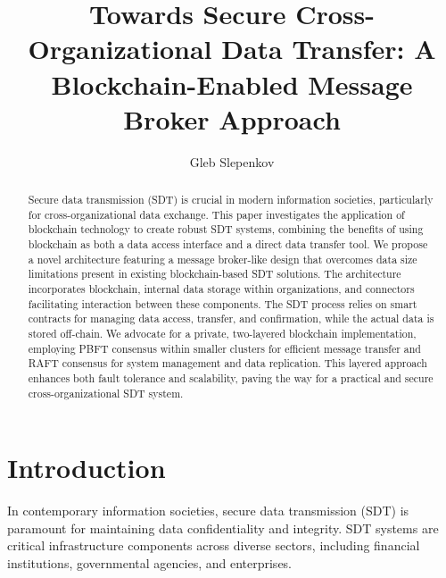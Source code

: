 \documentclass[10pt]{llncs}
\begin{document}
\title{Towards Secure Cross-Organizational Data Transfer: A Blockchain-Enabled Message Broker Approach}
\author{Gleb Slepenkov}

\maketitle

\begin{abstract}
    Secure data transmission (SDT) is crucial in modern information societies, particularly for cross-organizational data exchange. 
    This paper investigates the application of blockchain technology to create robust SDT systems, combining the benefits of using blockchain as both a data access interface and a direct data transfer tool. 
    We propose a novel architecture featuring a message broker-like design that overcomes data size limitations present in existing blockchain-based SDT solutions. 
    The architecture incorporates blockchain, internal data storage within organizations, and connectors facilitating interaction between these components. 
    The SDT process relies on smart contracts for managing data access, transfer, and confirmation, while the actual data is stored off-chain. 
    We advocate for a private, two-layered blockchain implementation, employing PBFT consensus within smaller clusters for efficient message transfer and RAFT consensus for system management and data replication. This layered approach enhances both fault tolerance and scalability, paving the way for a practical and secure cross-organizational SDT system.
    
\end{abstract}

\section{Introduction}

In contemporary information societies, secure data transmission (SDT) is paramount for maintaining data confidentiality and integrity.
SDT systems are critical infrastructure components across diverse sectors, including financial institutions, governmental agencies, and enterprises.
\end{document}
